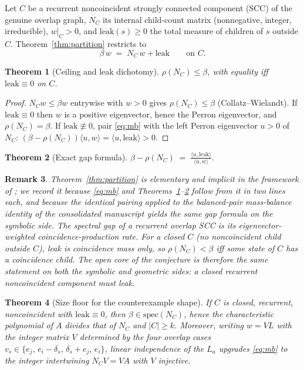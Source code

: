 \documentclass[11pt]{article}
\newtheorem{theorem}{Theorem}[section]
\newtheorem{remark}[theorem]{Remark}
\newcommand{\NC}{N_{C}}
\begin{document}
Let $C$ be a recurrent noncoincident strongly connected component (SCC)
of the genuine overlap graph, $\NC$ its internal child-count matrix
(nonnegative, integer, irreducible), $w|_C>0$, and
$\mathrm{leak}(s)\ge 0$ the total measure of children of $s$ outside
$C$. Theorem~\ref{thm:partition} restricts to
\begin{equation}\label{eq:mb}
\beta\,w \;=\; \NC\,w+\mathrm{leak}\qquad\text{on }C.
\end{equation}

\begin{theorem}[Ceiling and leak dichotomy]\label{thm:dichotomy}
$\rho(\NC)\le\beta$, with equality iff $\mathrm{leak}\equiv 0$ on $C$.
\end{theorem}

\begin{proof}
$\NC w\le\beta w$ entrywise with $w>0$ gives $\rho(\NC)\le\beta$
(Collatz--Wielandt). If $\mathrm{leak}\equiv0$ then $w$ is a positive
eigenvector, hence the Perron eigenvector, and $\rho(\NC)=\beta$. If
$\mathrm{leak}\not\equiv0$, pair \eqref{eq:mb} with the left Perron
eigenvector $u>0$ of $\NC$:
$(\beta-\rho(\NC))\langle u,w\rangle=\langle u,\mathrm{leak}\rangle>0$.
\end{proof}

\begin{theorem}[Exact gap formula]\label{thm:gap}
$\displaystyle \beta-\rho(\NC)
 \;=\;\frac{\langle u,\mathrm{leak}\rangle}{\langle u,w\rangle}.$
\end{theorem}

\begin{remark}
Theorem~\ref{thm:partition} is elementary and implicit in the framework
of \cite{AL11}; we record it because \eqref{eq:mb} and
Theorems~\ref{thm:dichotomy}--\ref{thm:gap} follow from it in two lines
each, and because the identical pairing applied to the balanced-pair
mass-balance identity of the consolidated manuscript yields the same gap
formula on the symbolic side. The spectral gap of a recurrent overlap
SCC \emph{is} its eigenvector-weighted coincidence-production rate. For
a \emph{closed} $C$ (no noncoincident child outside $C$), leak is
coincidence mass only, so $\rho(\NC)<\beta$ iff some state of $C$ has a
coincidence child. The open core of the conjecture is therefore the same
statement on both the symbolic and geometric sides: \emph{a closed
recurrent noncoincident component must leak}.
\end{remark}

\begin{theorem}[Size floor for the counterexample shape]\label{thm:floor}
If $C$ is closed, recurrent, noncoincident with $\mathrm{leak}\equiv0$,
then $\beta\in\mathrm{spec}(\NC)$, hence the characteristic polynomial
of $A$ divides that of $\NC$ and $|C|\ge k$. Moreover, writing
$w=VL$ with the integer matrix $V$ determined by the four overlap cases
$v_s\in\{e_j,\,e_i-\delta_s,\,\delta_s+e_j,\,e_i\}$, linear independence
of the $L_a$ upgrades \eqref{eq:mb} to the integer intertwining
$\NC V=VA$ with $V$ injective.
\end{theorem}
\end{document}
